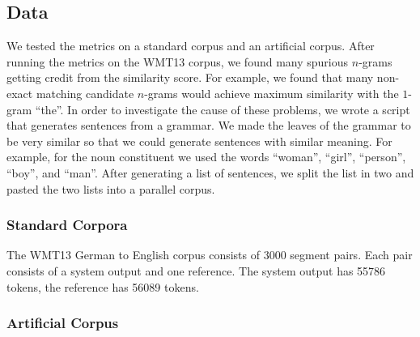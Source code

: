 

\subsection{Data}
\label{sec:data}


We tested the metrics on a standard corpus and an artificial corpus.
After running the metrics on the WMT13 corpus, we found many spurious $n$-grams getting credit from the similarity score. 
For example, we found that many non-exact matching candidate $n$-grams would achieve maximum similarity with the $1$-gram ``the''. 
In order to investigate the cause of these problems, we wrote a script that generates sentences from a grammar. 
We made the leaves of the grammar to be very similar so that we could generate sentences with similar meaning. 
For example, for the noun constituent we used the words ``woman'', ``girl'', ``person'', ``boy'', and ``man''. 
After generating a list of sentences, we split the list in two and pasted the two lists into a parallel corpus. 


\subsubsection{Standard Corpora}
\label{sec:standardcorp}

The WMT13 German to English corpus consists of $3000$ segment pairs. 
Each pair consists of a system output and one reference. 
The system output has 55786 tokens, the reference has 56089 tokens. 

\subsubsection{Artificial Corpus}
\label{sec:artificial}

